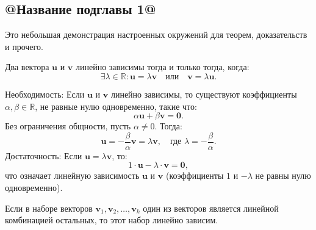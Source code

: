 \subsection{@Название подглавы 1@}

Это небольшая демонстрация настроенных окружений для теорем, доказательств и прочего.

\begin{thm}{}
Два вектора $\mathbf{u}$ и $\mathbf{v}$ линейно зависимы тогда и только тогда, когда:
\begin{equation*}
    \exists \lambda \in \mathbb{R} \colon \mathbf{u} = \lambda \mathbf{v} \quad \text{или} \quad \mathbf{v} = \lambda \mathbf{u}.
\end{equation*}

\end{thm}

\begin{prf}[]{}
Необходимость: Если \( \mathbf{u} \) и \( \mathbf{v} \) линейно зависимы, то существуют коэффициенты $\alpha, \beta \in \mathbb{R}$, не равные нулю одновременно, такие что:
\begin{equation*}
    \alpha \mathbf{u} + \beta \mathbf{v} = \mathbf{0}.
\end{equation*}
Без ограничения общности, пусть \( \alpha \neq 0 \). Тогда:
\begin{equation*}
    \mathbf{u} = -\frac{\beta}{\alpha} \mathbf{v} = \lambda \mathbf{v}, \quad \text{где } \lambda = -\frac{\beta}{\alpha}.
\end{equation*}
Достаточность: Если $\mathbf{u} = \lambda \mathbf{v} $, то:
\begin{equation*}
    1 \cdot \mathbf{u} - \lambda \cdot \mathbf{v} = \mathbf{0},
\end{equation*}
что означает линейную зависимость $\mathbf{u}$ и $\mathbf{v}$ (коэффициенты $1$ и $-\lambda$ не равны нулю одновременно).
\end{prf}

\begin{lem}{}
    Если в наборе векторов $\mathbf{v}_1, \mathbf{v}_2, \dots, \mathbf{v}_k$ один из векторов является линейной комбинацией остальных, то этот набор линейно зависим.
\end{lem}

